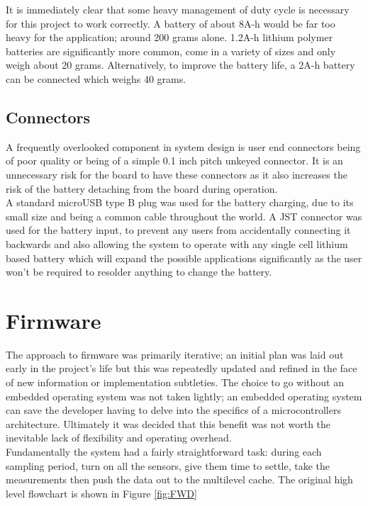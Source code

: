 \documentclass[12pt,openany,a4paper]{book}
\begin{document}
		It is immediately clear that some heavy management of duty cycle is necessary for this project to work correctly. A battery of about 8A-h would be far too heavy for the application; around 200 grams alone. 1.2A-h lithium polymer batteries are significantly more common, come in a variety of sizes and only weigh about 20 grams. Alternatively, to improve the battery life, a 2A-h battery can be connected which weighs 40 grams.
		
		\subsection{Connectors}
		A frequently overlooked component in system design is user end connectors being of poor quality or being of a simple 0.1 inch pitch unkeyed connector. It is an unnecessary risk for the board to have these connectors as it also increases the risk of the battery detaching from the board during operation.\\
		
		A standard microUSB type B plug was used for the battery charging, due to its small size and being a common cable throughout the world. A JST connector was used for the battery input, to prevent any users from accidentally connecting it backwards and also allowing the system to operate with any single cell lithium based battery which will expand the possible applications significantly as the user won't be required to resolder anything to change the battery. 
		
	\newpage
	\section{Firmware}
		The approach to firmware was primarily iterative; an initial plan was laid out early in the project's life but this was repeatedly updated and refined in the face of new information or implementation subtleties. The choice to go without an embedded operating system was not taken lightly; an embedded operating system can save the developer having to delve into the specifics of a microcontrollers architecture. Ultimately it was decided that this benefit was not worth the inevitable lack of flexibility and operating overhead. \\
		
		Fundamentally the system had a fairly straightforward task: during each sampling period, turn on all the sensors, give them time to settle, take the measurements then push the data out to the multilevel cache. The original high level flowchart is shown in Figure \ref{fig:FWD}
		
\end{document}
